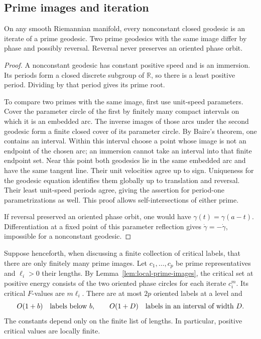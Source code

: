 \subsection{Prime images and iteration}

\begin{lemma}\label{lem:local-prime-images}
On any smooth Riemannian manifold, every nonconstant closed geodesic
is an iterate of a prime geodesic.
Two prime geodesics with the same image differ by phase and possibly
reversal.  Reversal never preserves an oriented phase orbit.
\end{lemma}

\begin{proof}
A nonconstant geodesic has constant positive speed and is an
immersion.  Its periods form a closed discrete subgroup of
\(\mathbb R\), so there is a least positive period.  Dividing by that
period gives its prime root.

To compare two primes with the same image, first use unit-speed
parameters.  Cover the parameter circle of the first by finitely many
compact intervals on which it is an embedded arc.  The inverse
images of those arcs under the second geodesic form a finite closed
cover of its parameter circle.  By Baire's theorem, one contains an
interval.  Within this interval choose a point whose image is not an
endpoint of the chosen arc; an immersion cannot take an interval
into that finite endpoint set.  Near this point both geodesics lie
in the same embedded arc and have the same tangent line.  Their
unit velocities agree up to sign.  Uniqueness for the geodesic
equation identifies them globally up to translation and reversal.
Their least unit-speed periods agree, giving the assertion for
period-one parametrizations as well.  This proof allows
self-intersections of either prime.

If reversal preserved an oriented phase orbit, one would have
\(\gamma(t)=\gamma(a-t)\).  Differentiation at a fixed point of this
parameter reflection gives \(\dot\gamma=-\dot\gamma\), impossible for
a nonconstant geodesic.
\end{proof}

Suppose henceforth, when discussing a finite collection of critical
labels, that there are only finitely many prime images.  Let
\(c_1,\ldots,c_p\) be prime representatives and \(\ell_i>0\) their
lengths.  By Lemma~\ref{lem:local-prime-images}, the critical set at
positive energy consists of the two oriented phase circles for
each iterate \(c_i^m\).  Its critical \(F\)-values are \(m\ell_i\).
There are at most \(2p\) oriented labels at a level and
\begin{equation}\label{eq:local-event-count}
 O(1+b)\quad\hbox{labels below \(b\)},\qquad
 O(1+D)\quad\hbox{labels in an interval of width \(D\)}.
\end{equation}
The constants depend only on the finite list of lengths.  In
particular, positive critical values are locally finite.


